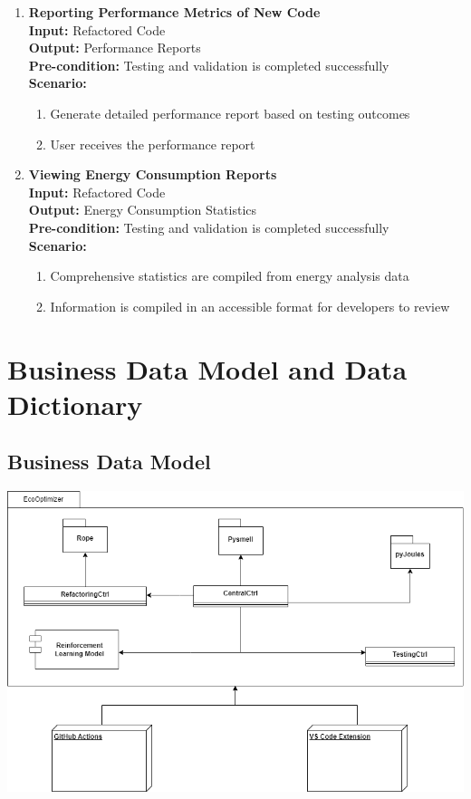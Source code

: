 \documentclass[12pt]{article}
\begin{document}
\begin{enumerate}[label={\bf BUC \arabic*:}, wide=0pt, font=\itshape]
  \item {\bf Reporting Performance Metrics of New Code} \\[2mm]
    \textbf{Input:} Refactored Code \\
    \textbf{Output:} Performance Reports\\
    \textbf{Pre-condition:} Testing and validation is completed successfully \\[2mm]
    \textbf{Scenario: }
    \begin{enumerate}[label=\arabic*.]
        \item Generate detailed performance report based on testing outcomes
        \item User receives the performance report
    \end{enumerate}

  \item {\bf Viewing Energy Consumption Reports} \\[2mm]
    \textbf{Input:} Refactored Code \\
    \textbf{Output:} Energy Consumption Statistics \\
    \textbf{Pre-condition:} Testing and validation is completed successfully \\[2mm]
    \textbf{Scenario: }
    \begin{enumerate}[label=\arabic*.]
        \item Comprehensive statistics are compiled from energy analysis data
        \item Information is compiled in an accessible format for developers to review
    \end{enumerate}
\end{enumerate}

\section{Business Data Model and Data Dictionary}
\subsection{Business Data Model}
\includegraphics[width=\textwidth]{../Images/business-data-model.png}
\end{document}
